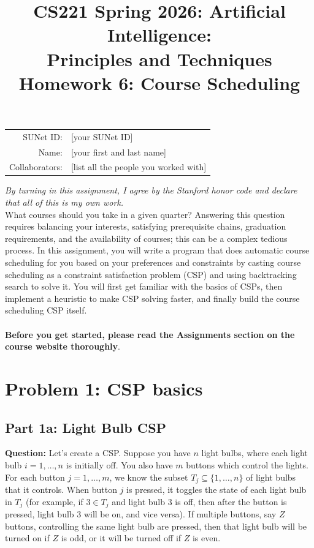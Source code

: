 \documentclass{article}
\title{\textbf{CS221 Spring 2026: Artificial Intelligence:\\ Principles and Techniques} \\Homework 6: Course Scheduling}
\date{}
\theoremstyle{case}
\theoremstyle{definition}
\begin{document}
\maketitle

\begin{center}
\begin{tabular}{rl}
SUNet ID: & [your SUNet ID] \\
Name: & [your first and last name] \\
Collaborators: & [list all the people you worked with]
\end{tabular}
\end{center}
\textit{By turning in this assignment, I agree by the Stanford honor code and declare
that all of this is my own work.} \\
\fontsize{12pt}{16pt}\selectfont
What courses should you take in a given quarter? Answering this question requires balancing your interests, satisfying prerequisite chains, graduation requirements, and the availability of courses; this can be a complex tedious process. In this assignment, you will write a program that does automatic course scheduling for you based on your preferences and constraints by casting course scheduling as a constraint satisfaction problem (CSP) and using backtracking search to solve it. You will first get familiar with the basics of CSPs, then implement a heuristic to make CSP solving faster, and finally build the course scheduling CSP itself. \\
\\
\textbf{Before you get started, please read the Assignments section on the course website thoroughly}.


\section*{Problem 1: CSP basics}

\subsection*{Part 1a: Light Bulb CSP}

\textbf{Question:} Let's create a CSP. Suppose you have $n$ light bulbs, where each light bulb $i = 1, \dots, n$ is initially off. You also have $m$ buttons which control the lights. For each button $j = 1, \dots, m$, we know the subset $T_j \subseteq \{ 1, \dots, n \}$ of light bulbs that it controls. When button $j$ is pressed, it toggles the state of each light bulb in $T_j$ (for example, if $3 \in T_j$ and light bulb 3 is off, then after the button is pressed, light bulb 3 will be on, and vice versa). If multiple buttons, say $Z$ buttons, controlling the same light bulb are pressed, then that light bulb will be turned on if $Z$ is odd, or it will be turned off if $Z$ is even.
\end{document}
